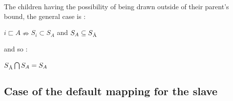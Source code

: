 \documentclass[a4paper]{article}
\newcommand{\child}			{\sqsubset}
\begin{document}
The children having the possibility of being drawn outside of their parent's bound, the general case is : 
\begin{center} $i \child A \nRightarrow S_i \subset S_A$ \hspace{0.2cm} and \hspace{0.2cm} $ S_A \subseteq S\textsubscript{\r{A}} $ \end{center}
and so :
\begin{center} $ S\textsubscript{\r{A}} \bigcap S_A = S_{A}$  \end{center}

%
%
%
%
%
%
%
%
%
%

\subsection{Case of the default mapping for the slave}\label{subsec:defaultMap}
\end{document}
